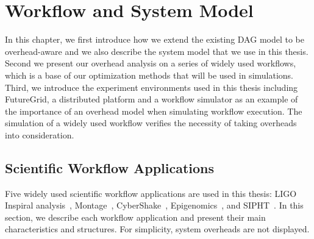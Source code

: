 \chapter{Workflow and System Model}
\label{chap:model}

In this chapter, we first introduce how we extend the existing DAG model to be overhead-aware and we also describe the system model that we use in this thesis. Second we present our overhead analysis on a series of widely used workflows, which is a base of our optimization methods that will be used in simulations. Third, we introduce the experiment environments used in this thesis including FutureGrid, a distributed platform and a workflow simulator as an example of the importance of an overhead model when simulating workflow execution. The simulation of a widely used workflow verifies the necessity of taking overheads into consideration.

\section{Scientific Workflow Applications}
\label{sec:applications}

Five widely used scientific workflow applications are used in this thesis: LIGO Inspiral analysis~\cite{LIGO}, Montage~\cite{Berriman2004}, CyberShake~\cite{Graves2010}, Epigenomics~\cite{Epigenome}, and SIPHT~\cite{SIPHT}. In this section, we describe each workflow application and present their main characteristics and structures. For simplicity, system overheads are not displayed.

